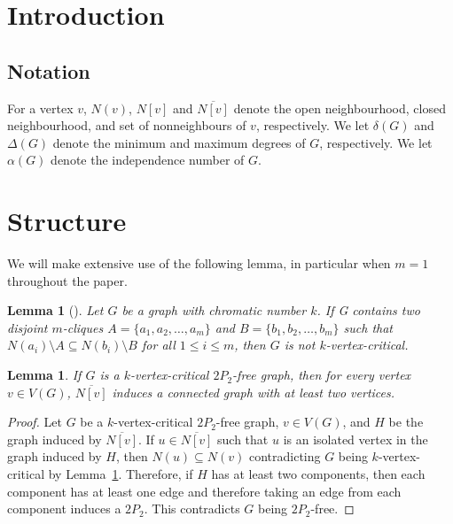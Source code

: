 \documentclass[11pt]{article}
\newtheorem{lemma}[theorem]{Lemma}
\theoremstyle{definition}
\newcommand{\noneighbs}{\overline{N[v]}}
\begin{document}
\section{Introduction}

\cite{KCameron2021}


\subsection{Notation}

For a vertex $v$, $N(v)$, $N[v]$ and $\noneighbs$ denote the open neighbourhood, closed neighbourhood, and set of nonneighbours of $v$, respectively. We let $\delta(G)$ and $\Delta(G)$ denote the minimum and maximum degrees of $G$, respectively. We let $\alpha(G)$ denote the independence number of $G$.

\section{Structure}

We will make extensive use of the following lemma, in particular when $m=1$ throughout the paper.

\begin{lemma}[\cite{Hoang2015}]\label{lem:nocomparablecliques}
Let $G$ be a graph with chromatic number $k$. If G contains two disjoint $m$-cliques $A = \{a_1, a_2,\ldots , a_m\}$ and $B = \{b_1, b_2,\ldots , b_m\}$ such that $N(a_i) \setminus A \subseteq N(b_i) \setminus B$ for all $1 \le i \le m$, then $G$ is not $k$-vertex-critical.
\end{lemma}




\begin{lemma}\label{lem:2P2freenonneighbconnected}
If $G$ is a $k$-vertex-critical $2P_2$-free graph, then for every vertex $v\in V(G)$,  $\noneighbs$ induces a connected graph with at least two vertices.
\end{lemma}
\begin{proof}
Let $G$ be a $k$-vertex-critical $2P_2$-free graph, $v\in V(G)$, and $H$ be the graph induced by $\noneighbs$. If $u\in \noneighbs$ such that $u$ is an isolated vertex in the graph induced by $H$, then $N(u)\subseteq N(v)$ contradicting $G$ being $k$-vertex-critical by Lemma~\ref{lem:nocomparablecliques}. Therefore, if $H$ has at least two components, then each component has at least one edge and therefore taking an edge from each component induces a $2P_2$. This contradicts $G$ being $2P_2$-free. 
\end{proof}
\end{document}
